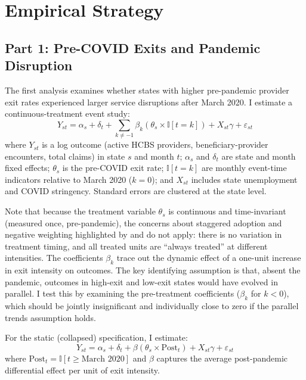 \documentclass[12pt]{article}
\newcommand{\ind}{\mathbb{I}}
\begin{document}
\section{Empirical Strategy}

\subsection{Part 1: Pre-COVID Exits and Pandemic Disruption}

The first analysis examines whether states with higher pre-pandemic provider exit rates experienced larger service disruptions after March 2020. I estimate a continuous-treatment event study:
\begin{equation}
Y_{st} = \alpha_s + \delta_t + \sum_{k \neq -1} \beta_k \left( \theta_s \times \ind[t = k] \right) + X_{st} \gamma + \varepsilon_{st}
\label{eq:eventstudy}
\end{equation}
where $Y_{st}$ is a log outcome (active HCBS providers, beneficiary-provider encounters, total claims) in state $s$ and month $t$; $\alpha_s$ and $\delta_t$ are state and month fixed effects; $\theta_s$ is the pre-COVID exit rate; $\ind[t = k]$ are monthly event-time indicators relative to March 2020 ($k = 0$); and $X_{st}$ includes state unemployment and COVID stringency. Standard errors are clustered at the state level.

Note that because the treatment variable $\theta_s$ is continuous and time-invariant (measured once, pre-pandemic), the concerns about staggered adoption and negative weighting highlighted by \citet{goodmanbacon2021} and \citet{callaway2021} do not apply: there is no variation in treatment timing, and all treated units are ``always treated'' at different intensities. The coefficients $\beta_k$ trace out the dynamic effect of a one-unit increase in exit intensity on outcomes. The key identifying assumption is that, absent the pandemic, outcomes in high-exit and low-exit states would have evolved in parallel. I test this by examining the pre-treatment coefficients ($\beta_k$ for $k < 0$), which should be jointly insignificant and individually close to zero if the parallel trends assumption holds.

For the static (collapsed) specification, I estimate:
\begin{equation}
Y_{st} = \alpha_s + \delta_t + \beta \left( \theta_s \times \text{Post}_{t} \right) + X_{st} \gamma + \varepsilon_{st}
\label{eq:did}
\end{equation}
where $\text{Post}_t = \ind[t \geq \text{March 2020}]$ and $\beta$ captures the average post-pandemic differential effect per unit of exit intensity.
\end{document}
